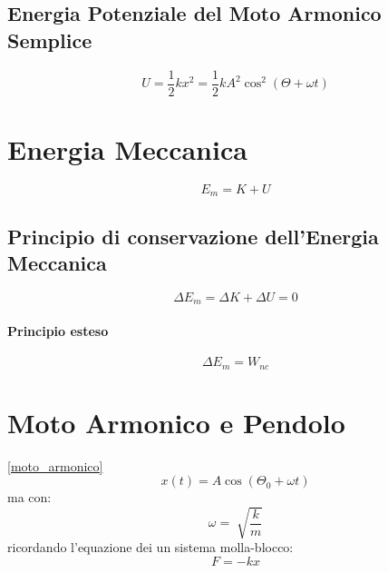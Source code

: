         \subsection*{Energia Potenziale del Moto Armonico Semplice}
            \begin{equation*}
                U = \frac{1}{2}kx^2 = \frac{1}{2}kA^2\cos^2(\Theta + \omega t)
            \end{equation*}

    \section*{Energia Meccanica}
        \begin{equation*}
            E_m = K + U
        \end{equation*}

        \subsection*{Principio di conservazione dell'Energia Meccanica}
            \begin{equation*}
                \Delta E_m = \Delta K + \Delta U = 0
            \end{equation*}

        \paragraph{Principio esteso}
            \begin{equation*}
                \Delta E_m = W_{nc}
            \end{equation*}
        

    \section*{Moto Armonico e Pendolo} \ref{moto_armonico}
        \begin{equation*}
            x(t) = A \cos(\Theta_0 + \omega t)
        \end{equation*}
        ma con:
        \begin{equation*}
            \omega = \sqrt[]{\frac{k}{m}}
        \end{equation*}
        ricordando l'equazione dei un sistema molla-blocco:
        \begin{equation*}
            F = -kx
        \end{equation*}
        
